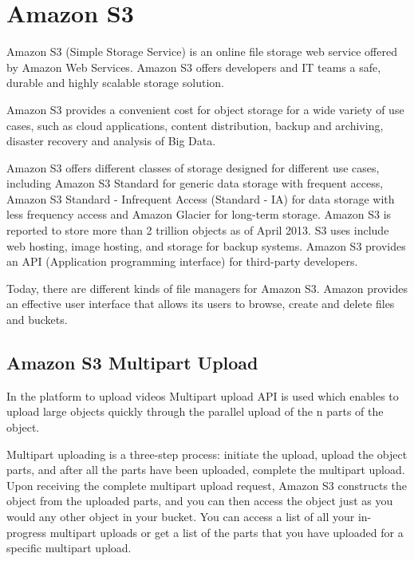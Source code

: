 \section{Amazon S3}
\label{sec:Amazon S3}

Amazon S3 (Simple Storage Service) is an online file storage web service offered by Amazon Web Services. Amazon S3 offers developers and IT teams a safe, durable and highly scalable storage solution.

Amazon S3 provides a convenient cost for object storage for a wide variety of use cases, such as cloud applications, content distribution, backup and archiving, disaster recovery and analysis of Big Data.

Amazon S3 offers different classes of storage designed for different use cases, including Amazon S3 Standard for generic data storage with frequent access, Amazon S3 Standard - Infrequent Access (Standard - IA) for data storage with less frequency access and Amazon Glacier for long-term storage.
Amazon S3 is reported to store more than 2 trillion objects as of April 2013.\cite{s3_stats} S3 uses include web hosting, image hosting, and storage for backup systems. 
Amazon S3 provides an API (Application programming interface) for third-party developers.

Today, there are different kinds of file managers for Amazon S3. 
Amazon provides an effective user interface that allows its users to browse, create and delete files and buckets.

\subsection{Amazon S3 Multipart Upload}
\label{subsec:amazon_S3_multipart_upload_initiation}


In the platform to upload videos Multipart upload API is used which enables to upload large objects quickly through the parallel upload of the n parts of the object.

Multipart uploading is a three-step process: initiate the upload, upload the object parts, and after all the parts have been uploaded, complete the multipart upload. Upon receiving the complete multipart upload request, Amazon S3 constructs the object from the uploaded parts, and you can then access the object just as you would any other object in your bucket.
You can access a list of all your in-progress multipart uploads or get a list of the parts that you have uploaded for a specific multipart upload.\cite{s3_multipart}


